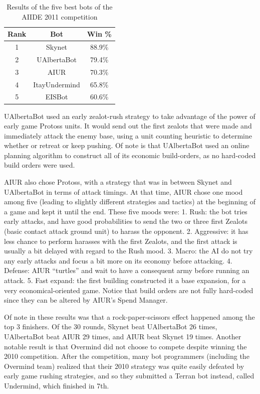 \documentclass{llncs}
\begin{document}
\begin{table}[!b]
\caption{Results of the five best bots of the AIIDE 2011 competition}
\label{tab:aiide2011}
\centering
\begin{tabular}{|c|c|c|}
\hline
{\bfseries Rank} & {\bfseries Bot} & {\bfseries Win \%} \\
\hline
1 & Skynet & 88.9\% \\
2 & UAlbertaBot & 79.4\% \\
3 & AIUR & 70.3\% \\
4 & ItayUndermind & 65.8\% \\
5 & EISBot & 60.6\% \\
\hline
\end{tabular}
\end{table}

UAlbertaBot used an early zealot-rush strategy to take advantage of the power of early game Protoss units. 
It would send out the first zealots that were made and immediately attack the enemy base, using a unit
counting heuristic to determine whether or retreat or keep pushing. Of note is that UAlbertaBot used an
online planning algorithm to construct all of its economic build-orders\cite{churchill2011build}, as no hard-coded build orders
were used. 

AIUR also chose  Protoss, with a strategy that was in between Skynet
and UAlbertaBot in terms of  attack timings.  At that time, AIUR chose
one  mood among  five (leading  to slightly  different  strategies and
tactics) at the  beginning of a game and kept it  until the end. These
five moods were: 1. Rush: the bot tries early attacks, and have good
  probabilities to send the two or three first Zealots (basic contact attack ground unit) to harass the
  opponent. 2. Aggressive: it has less chance to perform harasses with
  the first Zealots, and the first attack is usually a bit delayed
  with regard to the Rush mood. 3. Macro: the AI do not try any early attacks and focus a bit
  more on its economy before attacking. 4. Defense: AIUR  ``turtles'' and wait to have a consequent
  army before running an attack. 5. Fast expand:  the  first building  constructed it  a base
  expansion, for a very economical-oriented game. Notice that build orders are not fully hard-coded since they can be
altered by AIUR's Spend Manager.

Of  note  in  these  results  was that  a  rock-paper-scissors  effect
happened among  the top  3 finishers.  Of  the 30 rounds,  Skynet beat
UAlbertaBot 26  times, UAlbertaBot beat  AIUR 29 times, and  AIUR beat
Skynet  19 times.   Another notable  result is  that Overmind  did not
choose  to compete despite  winning the  2010 competition.   After the
competition,  many  bot  programmers  (including  the  Overmind  team)
realized that their  2010 strategy was quite easily  defeated by early
game rushing strategies,  and so they submitted a  Terran bot instead,
called Undermind, which finished in 7th.
\end{document}
